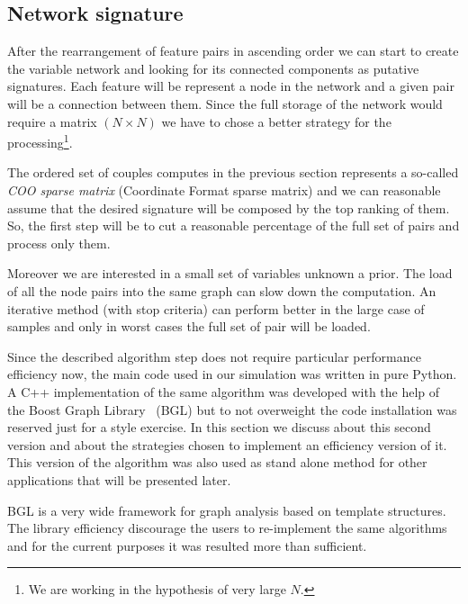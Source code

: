 \documentclass{standalone}
\begin{document}
\subsection[Network Signature]{Network signature}\label{implementation:network}

After the rearrangement of feature pairs in ascending order we can start to create the variable network and looking for its connected components as putative signatures.
Each feature will be represent a node in the network and a given pair will be a connection between them.
Since the full storage of the network would require a matrix $(N\times N)$ we have to chose a better strategy for the processing\footnote{
  We are working in the hypothesis of very large $N$.
}.

The ordered set of couples computes in the previous section represents a so-called \emph{COO sparse matrix} (Coordinate Format sparse matrix) and we can reasonable assume that the desired signature will be composed by the top ranking of them.
So, the first step will be to cut a reasonable percentage of the full set of pairs and process only them.

Moreover we are interested in a small set of variables unknown a prior.
The load of all the node pairs into the same graph can slow down the computation.
An iterative method (with stop criteria) can perform better in the large case of samples and only in worst cases the full set of pair will be loaded.

Since the described algorithm step does not require particular performance efficiency now, the main code used in our simulation was written in pure Python.
A C++ implementation of the same algorithm was developed with the help of the Boost Graph Library~\cite{BGL} (BGL) but to not overweight the code installation was reserved just for a style exercise.
In this section we discuss about this second version and about the strategies chosen to implement an efficiency version of it.
This version of the algorithm was also used as stand alone method for other applications that will be presented later.

BGL is a very wide framework for graph analysis based on template structures.
The library efficiency discourage the users to re-implement the same algorithms and for the current purposes it was resulted more than sufficient.
\end{document}

